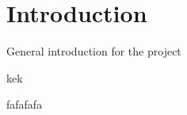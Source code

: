 \chapter{Introduction} \label{ch:Introduction}
General introduction for the project

kek

fafafafa

